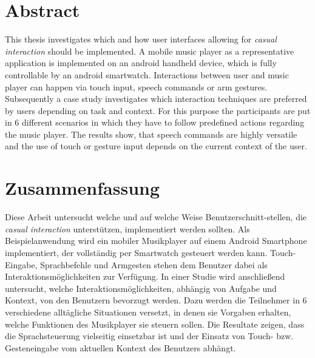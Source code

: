 \begingroup
\let\clearpage\relax
\let\cleardoublepage\relax
\let\cleardoublepage\relax

\chapter*{Abstract}
This thesis investigates which and how user interfaces allowing for \textit{casual interaction} should be implemented. A mobile music player as a representative application is implemented on an android handheld device, which is fully controllable by an android smartwatch. Interactions between user and music player can happen via touch input, speech commands or arm gestures. Subsequently a case study investigates which interaction techniques are preferred by users depending on task and context. For this purpose the participants are put in 6 different scenarios in which they have to follow predefined actions regarding the music player. The results show, that speech commands are highly versatile and the use of touch or gesture input depends on the current context of the user.


\vfill

\chapter*{Zusammenfassung}
Diese Arbeit untersucht welche und auf welche Weise Benutzerschnitt-stellen, die \textit{casual interaction} unterst\"utzen, implementiert werden sollten. Als Beispielanwendung wird ein mobiler Musikplayer auf einem Android Smartphone implementiert, der vollst\"andig per Smartwatch gesteuert werden kann. Touch-Eingabe, Sprachbefehle und Armgesten stehen dem Benutzer dabei als Interaktionsm\"oglichkeiten zur Verf\"ugung. In einer Studie wird anschlie\ss{}end untersucht, welche Interaktionsm\"oglichkeiten, abh\"angig von Aufgabe und Kontext, von den Benutzern bevorzugt werden. Dazu werden die Teilnehmer in 6 verschiedene allt\"agliche Situationen versetzt, in denen sie Vorgaben erhalten, welche Funktionen des Musikplayer sie steuern sollen. Die Resultate zeigen, dass die Sprachsteuerung vielseitig einsetzbar ist und der Einsatz von Touch- bzw. Gesteneingabe vom aktuellen Kontext des Benutzers abh\"angt.


\endgroup			

\vfill
